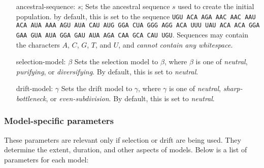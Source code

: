 \documentclass{article}
\begin{document}
\begin{enumerate}
          \item[ancestral-sequence: $s$;]
          Sets the ancestral sequence $s$ used to create the initial population.
          by default, this is set to the sequence {\tt UGU ACA AGA AAC AAC AAU
          ACA AUA AAA AGU AUA CAU AUG GGA CUA GGG AGG ACA UUU UAU ACA ACA GGA
          GAA GUA AUA GGA GAU AUA AGA CAA GCA CAU UGU}. Sequences may contain
          the characters $A$, $C$, $G$, $T$, and $U$, and {\em cannot contain
          any whitespace}.

          \item[selection-model: $\beta$]
          Sets the selection model to $\beta$, where $\beta$ is one of {\em
          neutral}, {\em purifying}, or {\em diversifying}. By default, this is
          set to {\em neutral}.

          \item[drift-model: $\gamma$]
          Sets the drift model to $\gamma$, where $\gamma$ is one of {\em
          neutral}, {\em sharp-bottleneck}, or {\em even-subdivision}. By
          default, this is set to {\em neutral}.
        \end{enumerate}

      \subsubsection{Model-specific parameters}
        \label{sec:model-directives}

        These parameters are relevant only if selection or drift are being used.
        They determine the extent, duration, and other aspects of models. Below
        is a list of parameters for each model:
\end{document}

